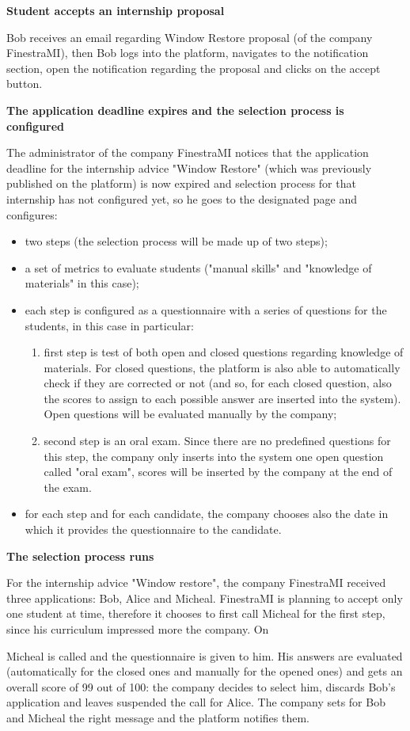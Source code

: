 			\textbf{Student accepts an internship proposal}
			\begin{flushleft}
				Bob receives an email regarding Window Restore proposal (of the company FinestraMI), then Bob logs into the platform, navigates to the notification section, open the notification regarding the proposal and clicks on the accept button.
			\end{flushleft}
			\textbf{The application deadline expires and the selection process is configured}
			\begin{flushleft}
				The administrator of the company FinestraMI notices that the application deadline for the internship advice "Window Restore" (which was previously published on the platform) is now expired and selection process for that internship has not configured yet, so he goes to the designated page and configures:
				\begin{itemize}
					\item two steps (the selection process will be made up of two steps);
					\item a set of metrics to evaluate students ("manual skills" and "knowledge of materials" in this case);
					\item each step is configured as a questionnaire with a series of questions for the students, in this case in particular:
						\begin{enumerate}
							\item first step is test of both open and closed questions regarding knowledge of materials. For closed questions, the platform is also able to automatically check if they are corrected or not (and so, for each closed question, also the scores to assign to each possible answer are inserted into the system). Open questions will be evaluated manually by the company;
							\item second step is an oral exam. Since there are no predefined questions for this step, the company only inserts into the system one open question called "oral exam", scores will be inserted by the company at the end of the exam.
						\end{enumerate}
					\item for each step and for each candidate, the company chooses also the date in which it provides the questionnaire to the candidate.
				\end{itemize}
			\end{flushleft}
			\textbf{The selection process runs}
			\begin{flushleft}
				For the internship advice "Window restore", the company FinestraMI received three applications: Bob, Alice and Micheal. FinestraMI is planning to accept only one student at time, therefore it chooses to first call Micheal for the first step, since his curriculum impressed more the company. On \date{23/11/2024} Micheal is called and the questionnaire is given to him. His answers are evaluated (automatically for the closed ones and manually for the opened ones) and gets an overall score of 99 out of 100: the company decides to select him, discards Bob's application and leaves suspended the call for Alice. The company sets for Bob and Micheal the right message and the platform notifies them. 
			\end{flushleft}
